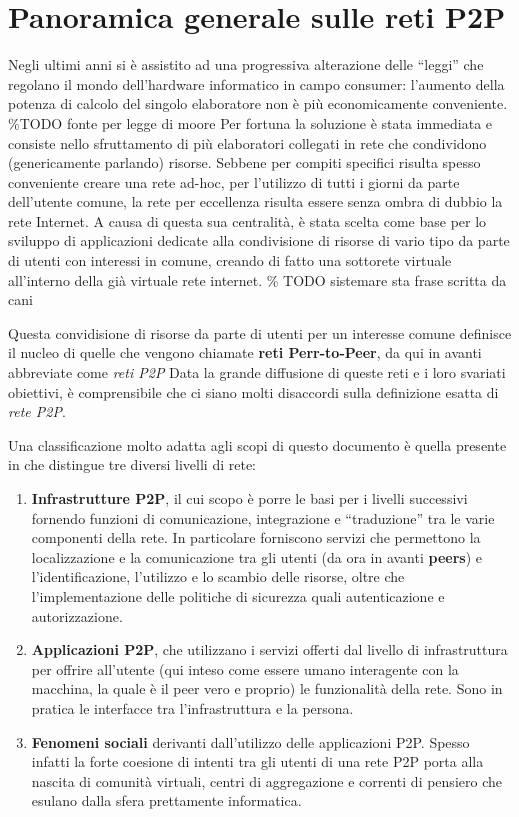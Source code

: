 \chapter{Panoramica generale sulle reti
P2P}\label{panoramica-generale-sulle-reti-p2p}

Negli ultimi anni si è assistito ad una progressiva alterazione delle
``leggi'' che regolano il mondo dell'hardware informatico in campo
consumer: l'aumento della potenza di calcolo del singolo elaboratore non
è più economicamente conveniente. \%TODO fonte per legge di moore Per
fortuna la soluzione è stata immediata e consiste nello sfruttamento di
più elaboratori collegati in rete che condividono (genericamente
parlando) risorse. Sebbene per compiti specifici risulta spesso
conveniente creare una rete ad-hoc, per l'utilizzo di tutti i giorni da
parte dell'utente comune, la rete per eccellenza risulta essere senza
ombra di dubbio la rete Internet. A causa di questa sua centralità, è
stata scelta come base per lo sviluppo di applicazioni dedicate alla
condivisione di risorse di vario tipo da parte di utenti con interessi
in comune, creando di fatto una sottorete virtuale all'interno della già
virtuale rete internet. \% TODO sistemare sta frase scritta da cani

Questa convidisione di risorse da parte di utenti per un interesse
comune definisce il nucleo di quelle che vengono chiamate \textbf{reti
Perr-to-Peer}, da qui in avanti abbreviate come \emph{reti P2P} Data la
grande diffusione di queste reti e i loro svariati obiettivi, è
comprensibile che ci siano molti disaccordi sulla definizione esatta di
\emph{rete P2P}.

Una classificazione molto adatta agli scopi di questo documento è quella
presente in \cite{core-concepts-p2p} che distingue tre diversi livelli
di rete:

\begin{enumerate}
\def\labelenumi{\arabic{enumi}.}
\item
  \textbf{Infrastrutture P2P}, il cui scopo è porre le basi per i
  livelli successivi fornendo funzioni di comunicazione, integrazione e
  ``traduzione'' tra le varie componenti della rete. In particolare
  forniscono servizi che permettono la localizzazione e la comunicazione
  tra gli utenti (da ora in avanti \textbf{peers}) e l'identificazione,
  l'utilizzo e lo scambio delle risorse, oltre che l'implementazione
  delle politiche di sicurezza quali autenticazione e autorizzazione.
\item
  \textbf{Applicazioni P2P}, che utilizzano i servizi offerti dal
  livello di infrastruttura per offrire all'utente (qui inteso come
  essere umano interagente con la macchina, la quale è il peer vero e
  proprio) le funzionalità della rete. Sono in pratica le interfacce tra
  l'infrastruttura e la persona.
\item
  \textbf{Fenomeni sociali} derivanti dall'utilizzo delle applicazioni
  P2P. Spesso infatti la forte coesione di intenti tra gli utenti di una
  rete P2P porta alla nascita di comunità virtuali, centri di
  aggregazione e correnti di pensiero che esulano dalla sfera
  prettamente informatica.
\end{enumerate}


